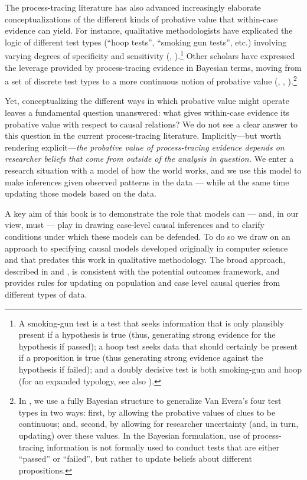 \documentclass[
  12pt,
]{book}
\begin{document}
The process-tracing literature has also advanced increasingly elaborate conceptualizations of the different kinds of probative value that within-case evidence can yield. For instance, qualitative methodologists have explicated the logic of different test types (``hoop tests'', ``smoking gun tests'', etc.) involving varying degrees of specificity and sensitivity (\citet{collier2011understanding}, \citet{Mahony:Logic:2012}).\footnote{A smoking-gun test is a test that seeks information that is only plausibly present if a hypothesis is true (thus, generating strong evidence for the hypothesis if passed); a hoop test seeks data that should certainly be present if a proposition is true (thus generating strong evidence against the hypothesis if failed); and a doubly decisive test is both smoking-gun and hoop (for an expanded typology, see also \citet{rohlfing2013comparative}).} Other scholars have expressed the leverage provided by process-tracing evidence in Bayesian terms, moving from a set of discrete test types to a more continuous notion of probative value (\citet{fairfield2017explicit}, \citet{BennettAppendix}, \citet{humphreys2015mixing}).\footnote{In \citet{humphreys2015mixing}, we use a fully Bayesian structure to generalize Van Evera's four test types in two ways: first, by allowing the probative values of clues to be continuous; and, second, by allowing for researcher uncertainty (and, in turn, updating) over these values. In the Bayesian formulation, use of process-tracing information is not formally used to conduct tests that are either ``passed'' or ``failed'', but rather to update beliefs about different propositions.}

Yet, conceptualizing the different ways in which probative value might operate leaves a fundamental question unanswered: what gives within-case evidence its probative value with respect to causal relations? We do not see a clear answer to this question in the current process-tracing literature. Implicitly---but worth rendering explicit---\emph{the probative value of process-tracing evidence depends on researcher beliefs that come from outside of the analysis in question.} We enter a research situation with a model of how the world works, and we use this model to make inferences given observed patterns in the data --- while at the same time updating those models based on the data.

A key aim of this book is to demonstrate the role that models can --- and, in our view, must --- play in drawing case-level causal inferences and to clarify conditions under which these models can be defended. To do so we draw on an approach to specifying causal models developed originally in computer science and that predates this work in qualitative methodology. The broad approach, described in \citet{cowell1999probabilistic} and \citet{pearl2009causality}, is consistent with the potential outcomes framework, and provides rules for updating on population and case level causal queries from different types of data.
\end{document}
